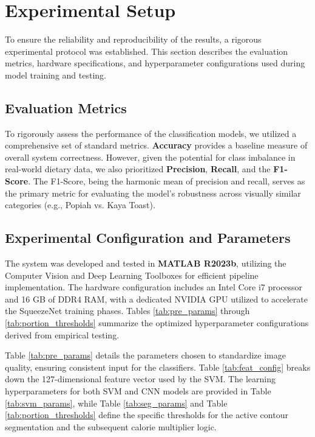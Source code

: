\documentclass[conference, a4paper]{IEEEtran}
\begin{document}
\section{Experimental Setup}
\label{sec:experimental}

To ensure the reliability and reproducibility of the results, a rigorous experimental protocol was established. This section describes the evaluation metrics, hardware specifications, and hyperparameter configurations used during model training and testing.

\subsection{Evaluation Metrics}
To rigorously assess the performance of the classification models, we utilized a comprehensive set of standard metrics. \textbf{Accuracy} provides a baseline measure of overall system correctness. However, given the potential for class imbalance in real-world dietary data, we also prioritized \textbf{Precision}, \textbf{Recall}, and the \textbf{F1-Score}. The F1-Score, being the harmonic mean of precision and recall, serves as the primary metric for evaluating the model's robustness across visually similar categories (e.g., Popiah vs. Kaya Toast).

\subsection{Experimental Configuration and Parameters}
The system was developed and tested in \textbf{MATLAB R2023b}, utilizing the Computer Vision and Deep Learning Toolboxes for efficient pipeline implementation. The hardware configuration includes an Intel Core i7 processor and 16 GB of DDR4 RAM, with a dedicated NVIDIA GPU utilized to accelerate the SqueezeNet training phases. Tables \ref{tab:pre_params} through \ref{tab:portion_thresholds} summarize the optimized hyperparameter configurations derived from empirical testing.

Table \ref{tab:pre_params} details the parameters chosen to standardize image quality, ensuring consistent input for the classifiers. Table \ref{tab:feat_config} breaks down the 127-dimensional feature vector used by the SVM. The learning hyperparameters for both SVM and CNN models are provided in Table \ref{tab:svm_params}, while Table \ref{tab:seg_params} and Table \ref{tab:portion_thresholds} define the specific thresholds for the active contour segmentation and the subsequent calorie multiplier logic.
\end{document}
